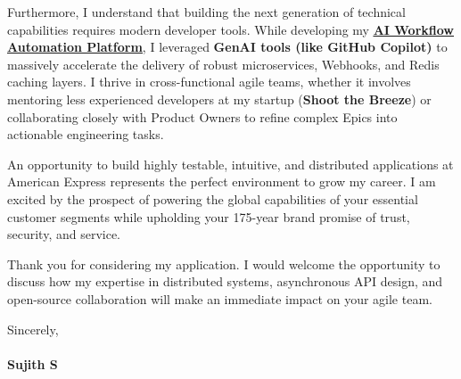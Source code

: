 \documentclass[a4paper,11pt]{article}
\newcommand{\ulink}[2]{\href{#1}{\uline{#2}}}
\begin{document}
Furthermore, I understand that building the next generation of technical capabilities requires modern developer tools. While developing my \ulink{https://github.com/su-jin1425/AI-Workflow-Automation-Platform}{\textbf{AI Workflow Automation Platform}}, I leveraged \textbf{GenAI tools (like GitHub Copilot)} to massively accelerate the delivery of robust microservices, Webhooks, and Redis caching layers. I thrive in cross-functional agile teams, whether it involves mentoring less experienced developers at my startup (\textbf{Shoot the Breeze}) or collaborating closely with Product Owners to refine complex Epics into actionable engineering tasks. 

An opportunity to build highly testable, intuitive, and distributed applications at American Express represents the perfect environment to grow my career. I am excited by the prospect of powering the global capabilities of your essential customer segments while upholding your 175-year brand promise of trust, security, and service.

Thank you for considering my application. I would welcome the opportunity to discuss how my expertise in distributed systems, asynchronous API design, and open-source collaboration will make an immediate impact on your agile team.

Sincerely, \\
\vspace{5pt} \\
\textbf{Sujith S}
\end{document}
